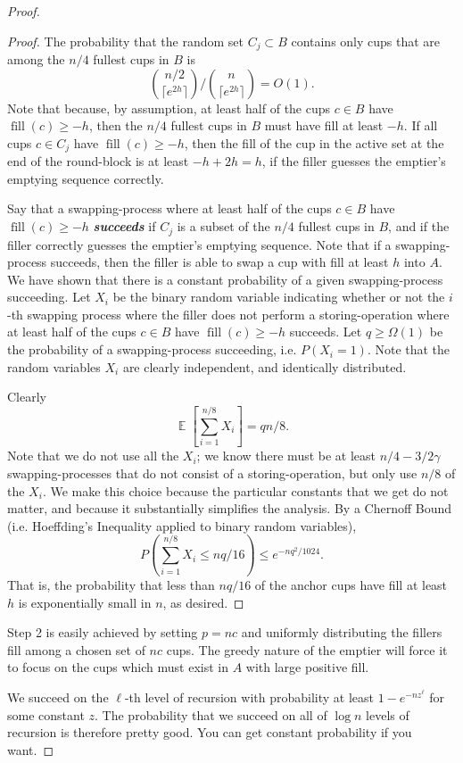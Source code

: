\documentclass[twocolumn]{article}[10pt]
\newcommand{\defn}[1]{{\textit{\textbf{\boldmath #1}}}\xspace}
\DeclareMathOperator{\E}{\mathbb{E}}
\DeclareMathOperator{\fil}{\text{fill}}
\begin{document}
\begin{proof}
\begin{proof}
  The probability that the random set $C_j \subset B$ contains only cups that
  are among the $n/4$ fullest cups in $B$ is $${n/2 \choose {\lceil e^{2h}
  \rceil}} / {n \choose {\lceil e^{2h}\rceil}} = O(1).$$ Note that because, by
  assumption, at least half of the cups $c \in B$ have $\fil(c) \ge -h$, then
  the $n/4$ fullest cups in $B$ must have fill at least $-h$. If all cups $
  c\in C_j$ have $\fil(c) \ge -h$, then the fill of the cup in the active set
  at the end of the round-block is at least $-h + 2h = h$, if the filler
  guesses the emptier's emptying sequence correctly.

  Say that a swapping-process where at least half of the cups $c\in B$ have
  $\fil(c) \ge -h$ \defn{succeeds} if $C_j$ is a subset of the $n/4$ fullest
  cups in $B$, and if the filler correctly guesses the emptier's emptying
  sequence. Note that if a swapping-process succeeds, then the filler is able
  to swap a cup with fill at least $h$ into $A$. We have shown that there is a
  constant probability of a given swapping-process succeeding. Let $X_i$ be the
  binary random variable indicating whether or not the $i$-th swapping process
  where the filler does not perform a storing-operation where at least half of
  the cups $c\in B$ have $\fil(c) \ge -h$ succeeds. Let $q \ge \Omega(1)$ be
  the probability of a swapping-process succeeding, i.e. $P(X_i=1)$. Note that
  the random variables $X_i$ are clearly independent, and identically
  distributed.

  Clearly $$\E\left[\sum_{i=1}^{n/8} X_i\right] = qn/8.$$ Note that we do not
  use all the $X_i$; we know there must be at least $n/4 - 3/2 \gamma$
  swapping-processes that do not consist of a storing-operation, but only use
  $n/8$ of the $X_i$. We make this choice because the particular constants that
  we get do not matter, and because it substantially simplifies the analysis.
  By a Chernoff Bound (i.e. Hoeffding's Inequality applied to binary random variables),
  $$P\left(\sum_{i=1}^{n/8} X_i\le nq/16\right) \le e^{-nq^2/1024}.$$ That is, the
  probability that less than $nq/16$ of the anchor cups have fill at least $h$ is
  exponentially small in $n$, as desired.

\end{proof}

Step 2 is easily achieved by setting $p=nc$ and uniformly distributing the
fillers fill among a chosen set of $nc$ cups. The greedy nature of the emptier will
force it to focus on the cups which must exist in $A$ with large positive fill.

We succeed on the $\ell$-th level of recursion with probability at least
$1-e^{-n z^\ell}$ for some constant $z$. The probability that we succeed on all
of $\log n$ levels of recursion is therefore pretty good. You can get constant
probability if you want.
  
\end{proof}
\end{document}
